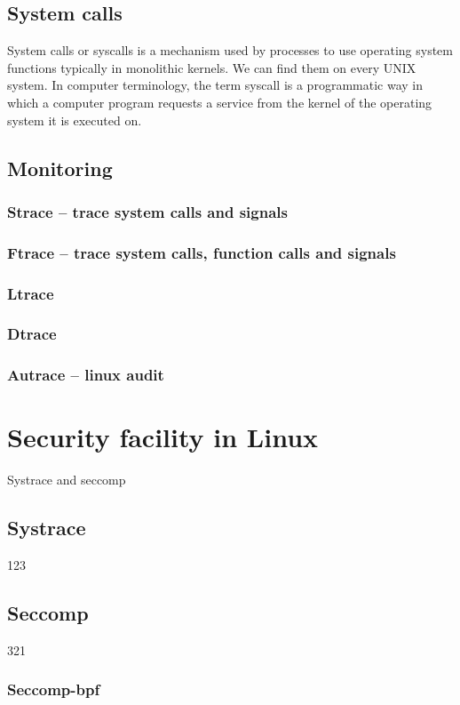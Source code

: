 \section{System calls}
System calls or syscalls is a mechanism used by processes to use operating system functions typically in monolithic kernels.
We can find them on every UNIX system.
In computer terminology, the term syscall is a programmatic way in which a computer program requests a service from the kernel of the operating system it is executed on.


\section{Monitoring}
\subsection{Strace -- trace system calls and signals}
\subsection{Ftrace -- trace system calls, function calls and signals}
\subsection{Ltrace}
\subsection{Dtrace}
\subsection{Autrace -- linux audit}

\chapter{Security facility in Linux}
Systrace and seccomp\cite{Pravidla}
\section{Systrace}
123

\section{Seccomp}
321
\subsection{Seccomp-bpf}

